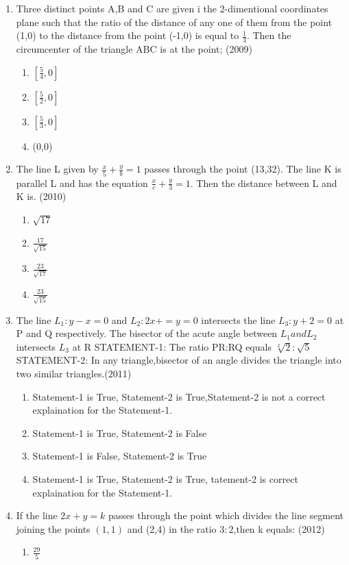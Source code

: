 \documentclass[12pt]{article}
\begin{document}
\begin{enumerate}
\item Three distinct points A,B and C are given i the 2-dimentional coordinates plane such that the ratio of the  distance of any one of them from the point (1,0) to the distance from the point (-1,0) is equal to $\frac{1}{3}$. Then the circumcenter of the triangle ABC is at the point; (2009)
\begin{enumerate}
\item $[\frac{5}{4} ,0]$ 
\item $[\frac{5}{2} ,0]$ 
\item $[\frac{5}{3} ,0]$
\item (0,0)
\end{enumerate}
\item The line L given by $\frac{x}{5}+\frac{y}{b}=1$ passes through the point (13,32). The line K is parallel L and has the equation $\frac{x}{c}+\frac{y}{3}=1$. Then the distance between L and K is. (2010)
\begin{enumerate}
\item $\sqrt{17}$  
\item $\frac{17}{\sqrt{15}}$ 
\item $\frac{23}{\sqrt{17}}$ 
\item $\frac{23}{\sqrt{15}}$
\end{enumerate}
\item The line $L_1:y-x=0$ and $L_2: 2x+=y=0$ intersects the line $L_3: y+2=0$ at P and Q respectively. The bisector of the acute angle between $L_1 and L_2$ intersects $L_3$ at R 
STATEMENT-1: The ratio PR:RQ equals $\sqrt[2]{2}:\sqrt{5}$\\
STATEMENT-2: In any triangle,bisector of an angle divides the triangle into two similar triangles.(2011)
\begin{enumerate}
\item Statement-1 is True, Statement-2 is True,Statement-2 is not a correct explaination for the Statement-1.
\item Statement-1 is True, Statement-2 is False
\item Statement-1 is False, Statement-2 is True
\item Statement-1 is True, Statement-2 is True, tatement-2 is correct explaination for the Statement-1.
\end{enumerate}
\item If the line $2x +y=k$ passes through the point which divides the line segment joining the points $(1,1)$ and (2,4) in the ratio $3:2$,then k equals: (2012)
\begin{enumerate}
\item $\frac{29}{5}$ 

\end{enumerate}
\end{enumerate}
\end{document}
